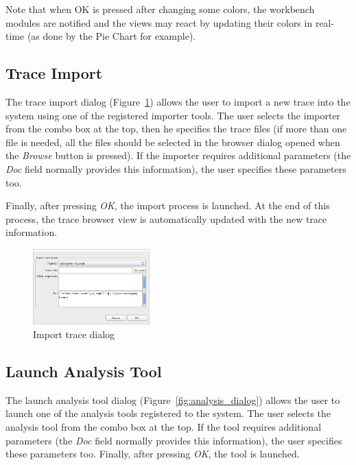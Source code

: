 \documentclass[twoside]{article}
\begin{document}
\begin{sloppypar}
Note that when OK is pressed after changing some colors, the workbench modules are notified and the views may react by updating their colors in real-time (as done by the Pie Chart for example).

\subsection{Trace Import}
\label{subsec:import}


The trace import dialog (Figure~\ref{fig:import_dialog}) allows the user to import a new trace into the system using one of the registered importer tools.
The user selects the importer from the combo box at the top, then he specifies the trace files (if more than one file is needed, all the files should be selected in the browser dialog opened when the \emph{Browse} button is pressed). 
If the importer requires additional parameters (the \emph{Doc} field normally provides this information), the user specifies these parameters too.

Finally, after pressing \emph{OK}, the import process is launched.
At the end of this process, the trace browser view is automatically updated with the new trace information.

\begin{figure}[h!]
  \centering
    \includegraphics[width=0.4\textwidth]{images/import_dialog.png}
  \caption{Import trace dialog}
  \label{fig:import_dialog}
\end{figure}

\subsection{Launch Analysis Tool}
\label{subsec:analysis}


The launch analysis tool dialog (Figure~\ref{fig:analysis_dialog}) allows the user to launch one of the analysis tools registered to the system.
The user selects the analysis tool from the combo box at the top. 
If the tool requires additional parameters (the \emph{Doc} field normally provides this information), the user specifies these parameters too. 
Finally, after pressing \emph{OK}, the tool is launched. 


\end{sloppypar}
\end{document}
